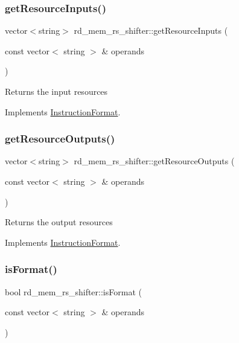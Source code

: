 \subsubsection{\texorpdfstring{get\+Resource\+Inputs()}{getResourceInputs()}}
{\footnotesize\ttfamily vector$<$string$>$ rd\+\_\+mem\+\_\+rs\+\_\+shifter\+::get\+Resource\+Inputs (\begin{DoxyParamCaption}\item[{const vector$<$ string $>$ \&}]{operands }\end{DoxyParamCaption})\hspace{0.3cm}{\ttfamily [virtual]}}

Returns the input resources 

Implements \hyperlink{classInstructionFormat_a09775d3a3c22f40a0f44504664e586e4}{Instruction\+Format}.

\mbox{\label{classrd__mem__rs__shifter_aa0e2be11d366b4dda2b50f14194ddfbf}} 
\subsubsection{\texorpdfstring{get\+Resource\+Outputs()}{getResourceOutputs()}}
{\footnotesize\ttfamily vector$<$string$>$ rd\+\_\+mem\+\_\+rs\+\_\+shifter\+::get\+Resource\+Outputs (\begin{DoxyParamCaption}\item[{const vector$<$ string $>$ \&}]{operands }\end{DoxyParamCaption})\hspace{0.3cm}{\ttfamily [virtual]}}

Returns the output resources 

Implements \hyperlink{classInstructionFormat_a95cd28ffb1bde59b67f676880ab10536}{Instruction\+Format}.

\mbox{\label{classrd__mem__rs__shifter_a483c16d44defe4965af7850ba9529cd7}} 
\subsubsection{\texorpdfstring{is\+Format()}{isFormat()}}
{\footnotesize\ttfamily bool rd\+\_\+mem\+\_\+rs\+\_\+shifter\+::is\+Format (\begin{DoxyParamCaption}\item[{const vector$<$ string $>$ \&}]{operands }\end{DoxyParamCaption})\hspace{0.3cm}{\ttfamily [virtual]}}


